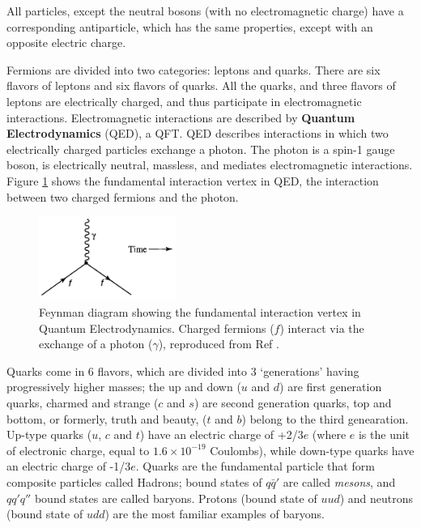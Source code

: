 \documentclass[11pt,a4paper,openright,twoside]{report}
\begin{document}
All particles, except the neutral bosons (with no electromagnetic charge) have a corresponding antiparticle, which has the same properties, except with an opposite electric charge.

Fermions are divided into two categories: leptons and quarks. There are six flavors of leptons and six flavors of quarks. All the quarks, and three flavors of leptons are electrically charged, and thus participate in electromagnetic interactions. Electromagnetic interactions are described by \textbf{Quantum Electrodynamics} (QED)\cite{QED}, a QFT. QED describes interactions in which two electrically charged particles exchange a photon. The photon is a spin-1 gauge boson, is electrically neutral, massless, and mediates electromagnetic interactions. Figure \ref{fig:qed_fund_vertex} shows the fundamental interaction vertex in QED, the interaction between two charged fermions and the photon.

\begin{figure}[H]
\centering
\includegraphics[width = 0.4\textwidth]{fundamental_vertex_qed.png}
\caption{Feynman diagram showing the fundamental interaction vertex in Quantum Electrodynamics. Charged fermions ($f$) interact via the exchange of a photon ($\gamma$), reproduced from Ref \cite{griff}.}
\label{fig:qed_fund_vertex}
\end{figure}

Quarks come in 6 flavors, which are divided into 3 `generations' having progressively higher masses; the up and down ($u$ and $d$) are first generation quarks, charmed and strange ($c$ and $s$) are second generation quarks, top and bottom, or formerly, truth and beauty, ($t$ and $b$) belong to the third genearation. Up-type quarks ($u$, $c$ and $t$) have an electric charge of +2/3$e$ (where $e$ is the unit of electronic charge, equal to $1.6\times 10^{-19}$ Coulombs), while down-type quarks have an electric charge of -1/3$e$. Quarks are the fundamental particle that form composite particles called Hadrons; bound states of $q\bar{q}'$ are called \textit{mesons}, and $qq'q''$ bound states are called baryons. Protons (bound state of $uud$) and neutrons (bound state of $udd$) are the most familiar examples of baryons.
\end{document}
